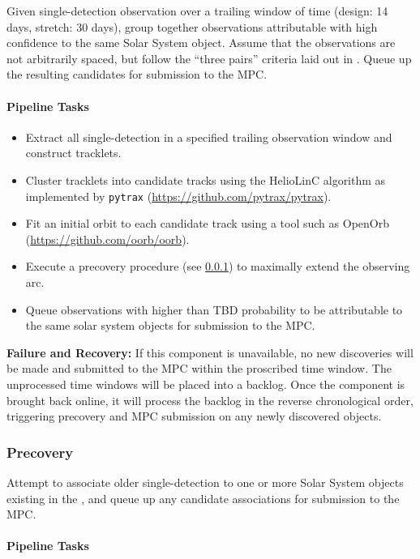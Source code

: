 Given single-detection observation over a trailing window of time (design: 14 days, stretch: 30 days), group together observations attributable with high confidence to the same Solar System object. Assume that the observations are not arbitrarily spaced, but follow the ``three pairs'' criteria laid out in \OSS\@ {}. Queue up the resulting candidates for submission to the MPC.

\paragraph{Pipeline Tasks}

\begin{itemize}
\item Extract all single-detection \DIAObjects in a specified trailing observation window and construct tracklets.
\item Cluster tracklets into candidate tracks using the HelioLinC algorithm as implemented by {\tt pytrax} (\url{https://github.com/pytrax/pytrax}).
\item Fit an initial orbit to each candidate track using a tool such as OpenOrb (\url{https://github.com/oorb/oorb}).
\item Execute a precovery procedure (see \ref{sec:mops:precovery}) to maximally extend the observing arc.
\item Queue observations with higher than TBD probability to be attributable to the same solar system objects for submission to the MPC.
\end{itemize}

{\bf Failure and Recovery:} If this component is unavailable, no new discoveries will be made and submitted to the MPC within the proscribed time window. The unprocessed time windows will be placed into a backlog. Once the component is brought back online, it will process the backlog in the reverse chronological order, triggering precovery and MPC submission on any newly discovered objects.

\subsubsection{Precovery}
\label{sec:mops:precovery}

Attempt to associate older single-detection \DIAObjects to one or more Solar System objects existing in the \MPCORB, and queue up any candidate associations for submission to the MPC.

\paragraph{Pipeline Tasks}

